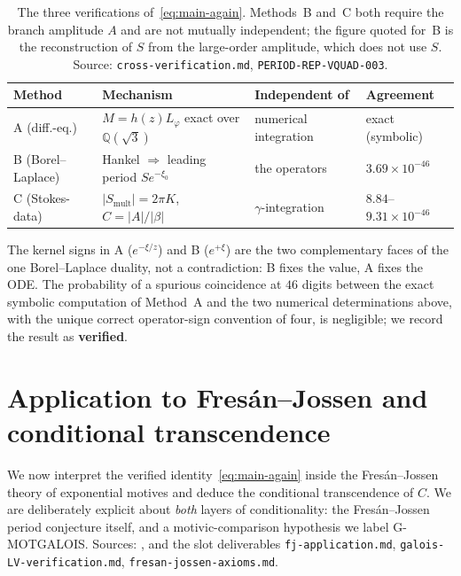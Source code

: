 \documentclass[11pt,reqno]{amsart}
\renewcommand{\_}{\vquadorigunderscore\allowbreak}
\theoremstyle{plain}
\theoremstyle{definition}
\newcommand{\Lphi}{L_{\varphi}}
\newcommand{\Qsqrt}{\mathbb{Q}(\sqrt3)}
\newcommand{\xizero}{\xi_0}
\providecommand{\C}{}\renewcommand{\C}{C}
\begin{document}
\begin{table}[h]
\centering
{\footnotesize
\begin{tabular}{@{}llll@{}}
\hline
Method & Mechanism & Independent of & Agreement \\
\hline
A (diff.-eq.) & $M=h(z)\Lphi$ exact over $\Qsqrt$ & numerical integration & exact (symbolic) \\
B (Borel--Laplace) & Hankel $\Rightarrow$ leading period $S e^{-\xizero}$ & the operators & $3.69\times10^{-46}$ \\
C (Stokes-data) & $\lvert S_{\mathrm{mult}}\rvert=2\pi K$, $\C=\lvert A\rvert/\lvert\beta\rvert$ & $\gamma$-integration & $8.84$--$9.31\times10^{-46}$ \\
\hline
\end{tabular}}
\caption{The three verifications of~\eqref{eq:main-again}. Methods~B and~C both require the
branch amplitude $A$ and are not mutually independent; the figure quoted for~B is the
reconstruction of $S$ from the large-order amplitude, which does not use $S$. Source:
\texttt{cross-verification.md}, \texttt{PERIOD-REP-VQUAD-003}.}
\label{tab:methods}
\end{table}

The kernel signs in A ($e^{-\xi/z}$) and B ($e^{+\xi}$) are the two complementary faces of the one
Borel--Laplace duality, not a contradiction: B fixes the value, A fixes the ODE. The probability of
a spurious coincidence at $46$ digits between the exact symbolic computation of Method~A and the
two numerical determinations above, with the unique correct operator-sign convention of four, is
negligible; we record the result as \textbf{verified}.

\section{Application to Fres\'an--Jossen and conditional transcendence}\label{sec:fj}

We now interpret the verified identity~\eqref{eq:main-again} inside the Fres\'an--Jossen theory of
exponential motives and deduce the conditional transcendence of $\C$. We are deliberately explicit
about \emph{both} layers of conditionality: the Fres\'an--Jossen period conjecture itself, and a
motivic-comparison hypothesis we label G-MOTGALOIS. Sources: \cite{FJ}, and the slot deliverables
\texttt{fj-application.md}, \texttt{galois-LV-verification.md}, \texttt{fresan-jossen-axioms.md}.
\end{document}
